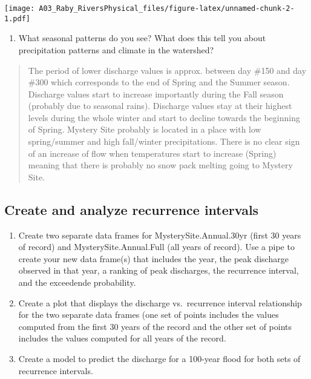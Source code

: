 \documentclass[]{article}
\providecommand{\tightlist}{%
  \setlength{\itemsep}{0pt}\setlength{\parskip}{0pt}}
\begin{document}
\texttt{[image: A03\_Raby\_RiversPhysical\_files/figure-latex/unnamed-chunk-2-1.pdf]}

\begin{enumerate}
\def\labelenumi{\arabic{enumi}.}
\setcounter{enumi}{7}
\tightlist
\item
  What seasonal patterns do you see? What does this tell you about
  precipitation patterns and climate in the watershed?
\end{enumerate}

\begin{quote}
The period of lower discharge values is approx. between day \#150 and
day \#300 which corresponds to the end of Spring and the Summer season.
Discharge values start to increase importantly during the Fall season
(probably due to seasonal rains). Discharge values stay at their highest
levels during the whole winter and start to decline towards the
beginning of Spring. Mystery Site probably is located in a place with
low spring/summer and high fall/winter precipitations. There is no clear
sign of an increase of flow when temperatures start to increase (Spring)
meaning that there is probably no snow pack melting going to Mystery
Site.
\end{quote}

\hypertarget{create-and-analyze-recurrence-intervals}{%
\subsection{Create and analyze recurrence
intervals}\label{create-and-analyze-recurrence-intervals}}

\begin{enumerate}
\def\labelenumi{\arabic{enumi}.}
\setcounter{enumi}{8}
\item
  Create two separate data frames for MysterySite.Annual.30yr (first 30
  years of record) and MysterySite.Annual.Full (all years of record).
  Use a pipe to create your new data frame(s) that includes the year,
  the peak discharge observed in that year, a ranking of peak
  discharges, the recurrence interval, and the exceedende probability.
\item
  Create a plot that displays the discharge vs.~recurrence interval
  relationship for the two separate data frames (one set of points
  includes the values computed from the first 30 years of the record and
  the other set of points includes the values computed for all years of
  the record.
\item
  Create a model to predict the discharge for a 100-year flood for both
  sets of recurrence intervals.
\end{enumerate}
\end{document}
